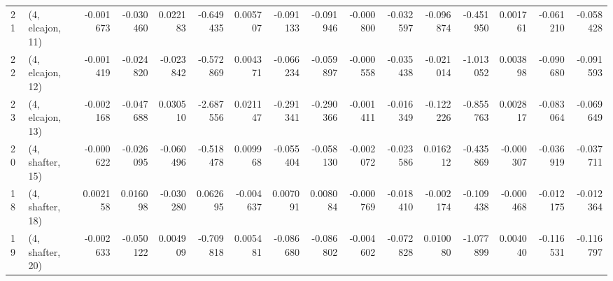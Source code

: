 \begin{tabular}{llrrrrrrrrrrrrrr}
21 &  (4, elcajon, 11) &  -0.001673 & -0.030460 &  0.022183 &  -0.649435 &  0.005707 &  -0.091133 & -0.091946 & -0.000800 & -0.032597 & -0.096874 &  -0.451950 &  0.001761 & -0.061210 & -0.058428 \\
22 &  (4, elcajon, 12) &  -0.001419 & -0.024820 & -0.023842 &  -0.572869 &  0.004371 &  -0.066234 & -0.059897 & -0.000558 & -0.035438 & -0.021014 &  -1.013052 &  0.003898 & -0.090680 & -0.091593 \\
23 &  (4, elcajon, 13) &  -0.002168 & -0.047688 &  0.030510 &  -2.687556 &  0.021147 &  -0.291341 & -0.290366 & -0.001411 & -0.016349 & -0.122226 &  -0.855763 &  0.002817 & -0.083064 & -0.069649 \\
20 &  (4, shafter, 15) &  -0.000622 & -0.026095 & -0.060496 &  -0.518478 &  0.009968 &  -0.055404 & -0.058130 & -0.002072 & -0.023586 &  0.016212 &  -0.435869 & -0.000307 & -0.036919 & -0.037711 \\
18 &  (4, shafter, 18) &   0.002158 &  0.016098 & -0.030280 &   0.062695 & -0.004637 &   0.007091 &  0.008084 & -0.000769 & -0.018410 & -0.002174 &  -0.109438 & -0.000468 & -0.012175 & -0.012364 \\
19 &  (4, shafter, 20) &  -0.002633 & -0.050122 &  0.004909 &  -0.709818 &  0.005481 &  -0.086680 & -0.086802 & -0.004602 & -0.072828 &  0.010080 &  -1.077899 &  0.004040 & -0.116531 & -0.116797 \\
\bottomrule
\end{tabular}
